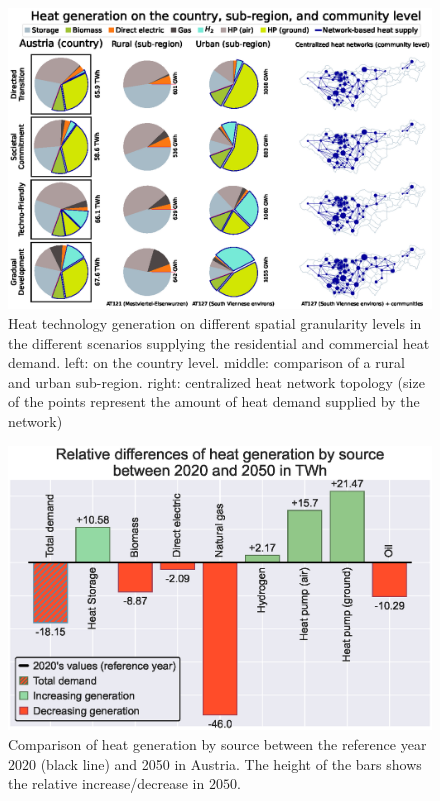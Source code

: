 \begin{figure}
	\centering
	\includegraphics[width=1\linewidth]{figures/4_Results/Fig_Matrix-plot/Spatial_results.eps}
	\caption{Heat technology generation on different spatial granularity levels in the different scenarios supplying the residential and commercial heat demand. left: on the country level. middle: comparison of a rural and urban sub-region. right: centralized heat network topology (size of the points represent the amount of heat demand supplied by the network)}
	\label{fig:res1}
\end{figure}

\begin{figure}
	\centering
	\includegraphics[width=1\linewidth]{figures/4_Results/Fig-Comp/Ref-2050.eps}
	\caption{Comparison of heat generation by source between the reference year $2020$ (black line) and 2050 in Austria. The height of the bars shows the relative increase/decrease in $2050$.}
	\label{fig:res-comp}
\end{figure}

